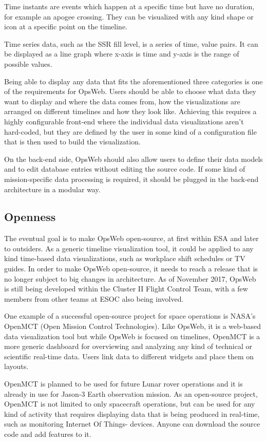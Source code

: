 Time instants are events which happen at a specific time but have no duration, for example an apogee crossing. They can be visualized with any kind shape or icon at a specific point on the timeline.

Time series data, such as the SSR fill level, is a series of time, value pairs. It can be displayed as a line graph where x-axis is time and y-axis is the range of possible values.

Being able to display any data that fits the aforementioned three categories is one of the requirements for OpsWeb. Users should be able to choose what data they want to display and where the data comes from, how the visualizations are arranged on different timelines and how they look like. Achieving this requires a highly configurable front-end where the individual data visualizations aren't hard-coded, but they are defined by the user in some kind of a configuration file that is then used to build the visualization.

On the back-end side, OpsWeb should also allow users to define their data models and to edit database entries without editing the source code. If some kind of mission-specific data processing is required, it should be plugged in the back-end architecture in a modular way.

\subsection{Openness}
The eventual goal is to make OpsWeb open-source, at first within ESA and later to outsiders. As a generic timeline visualization tool, it could be applied to any kind time-based data visualizations, such as workplace shift schedules or TV guides. In order to make OpsWeb open-source, it needs to reach a release that is no longer subject to big changes in architecture. As of November 2017, OpsWeb is still being developed within the Cluster II Flight Control Team, with a few members from other teams at ESOC also being involved. 

One example of a successful open-source project for space operations is NASA's OpenMCT (Open Mission Control Technologies). Like OpsWeb, it is a web-based data visualization tool but while OpsWeb is focused on timelines, OpenMCT is a more generic dashboard for overviewing and analyzing any kind of technical or scientific real-time data. Users link data to different widgets and place them on layouts. 

OpenMCT is planned to be used for future Lunar rover operations and it is already in use for Jason-3 Earth observation mission. As an open-source project, OpenMCT is not limited to only spacecraft operations, but can be used for any kind of activity that requires displaying data that is being produced in real-time, such as monitoring Internet Of Things- devices. Anyone can download the source code and add features to it. \cite{trimble2014reconfigurable, trimble2016open}


